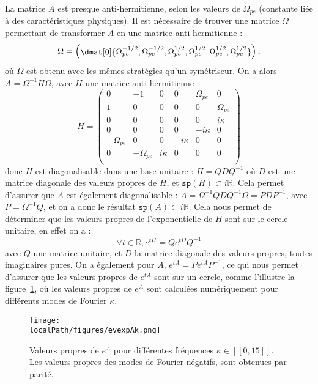 La matrice $A$ est presque anti-hermitienne, selon les valeurs de $\Omega_{pe}$ (constante liée à des caractéristiques physiques).  Il est nécessaire de trouver une matrice $\Omega$ permettant de transformer $A$ en une matrice anti-hermitienne :
$$
  \Omega = 
  \begin{pmatrix}
    \dmat[0]{\Omega_{pe}^{-1/2},\Omega_{pe}^{-1/2},\Omega_{pe}^{1/2},\Omega_{pe}^{1/2},\Omega_{pe}^{1/2},\Omega_{pe}^{1/2}}
  \end{pmatrix},
$$
où $\Omega$ est obtenu avec les mêmes stratégies qu'un symétriseur. On a alors $A = \Omega^{-1}H\Omega$, avec $H$ une matrice anti-hermitienne :
$$
  H = \begin{pmatrix}
    0           & -1           & 0       &  0       &  \Omega_{pe}  & 0           \\
    1           &  0           & 0       &  0       &  0            & \Omega_{pe} \\
    0           &  0           & 0       &  0       &  0            & i\kappa     \\
    0           &  0           & 0       &  0       & -i\kappa      & 0           \\
   -\Omega_{pe} &  0           & 0       & -i\kappa &  0            & 0           \\
    0           & -\Omega_{pe} & i\kappa &  0       &  0            & 0           \\
  \end{pmatrix}
$$
donc $H$ est diagonalisable dans une base unitaire : $H = QDQ^{-1}$ où $D$ est une matrice diagonale des valeurs propres de $H$, et $\texttt{sp}(H)\subset i\mathbb{R}$. Cela permet d'assurer que $A$ est également diagonalisable : $A = \Omega^{-1}QDQ^{-1}\Omega = PDP^{-1}$, avec $P=\Omega^{-1}Q$, et on a donc le résultat $\texttt{sp}(A)\subset i\mathbb{R}$. Cela nous permet de déterminer que les valeurs propres de l'exponentielle de $H$ sont sur le cercle unitaire, en effet on a :
$$
  \forall t\in\mathbb{R}, e^{tH} = Qe^{tD}Q^{-1}
$$
avec $Q$ une matrice unitaire, et $D$ la matrice diagonale des valeurs propres, toutes imaginaires pures. On a également pour $A$, $e^{tA}=Pe^{tA}P^{-1}$, ce qui nous permet d'assurer que les valeurs propres de $e^{tA}$ sont sur un cercle, comme l'illustre la figure~\ref{fig:evexpAk}, où les valeurs propres de $e^{A}$ sont calculées numériquement pour différents modes de Fourier $\kappa$.

\begin{figure}
  \centering
  \texttt{[image: \\localPath/figures/evexpAk.png]}
  \caption{Valeurs propres de $e^{A}$ pour différentes fréquences $\kappa\in[\![0,15]\!]$. Les valeurs propres des modes de Fourier négatifs, sont obtenues par parité.}
  \label{fig:evexpAk}
\end{figure}


